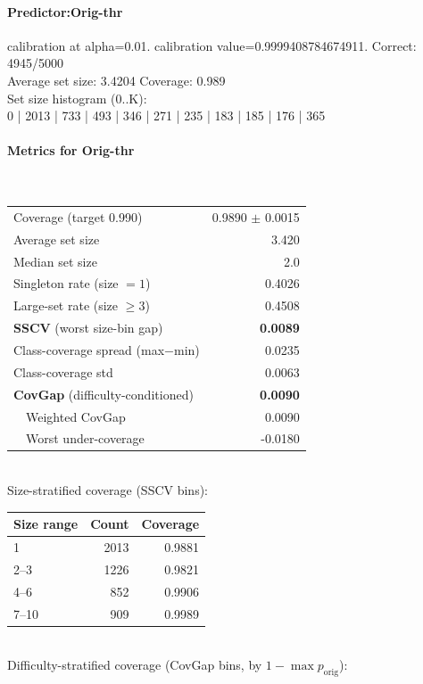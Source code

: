 \documentclass[parskip=half]{scrartcl}
\begin{document}
\paragraph{Predictor:Orig-thr} calibration at alpha=0.01. calibration value=0.9999408784674911. Correct: 4945/5000\\
Average set size: 3.4204   Coverage: 0.989\\
Set size histogram (0..K):\\
0 | 2013 | 733 | 493 | 346 | 271 | 235 | 183 | 185 | 176 | 365\\
\paragraph{Metrics for Orig-thr}~\\
\begin{tabular}{l r}
\hline
Coverage (target 0.990) & 0.9890 $\pm$ 0.0015 \\
Average set size & 3.420 \\
Median set size & 2.0 \\
Singleton rate (size $=1$) & 0.4026 \\
Large-set rate (size $\geq 3$) & 0.4508 \\
\textbf{SSCV} (worst size-bin gap) & \textbf{0.0089} \\
Class-coverage spread (max$-$min) & 0.0235 \\
Class-coverage std & 0.0063 \\
\textbf{CovGap} (difficulty-conditioned) & \textbf{0.0090} \\
~~Weighted CovGap & 0.0090 \\
~~Worst under-coverage & -0.0180 \\
\hline
\end{tabular}\\[0.5em]
\textsf{\scriptsize Size-stratified coverage (SSCV bins):}\\
\begin{tabular}{l r r}
\hline
Size range & Count & Coverage \\
\hline
1 & 2013 & 0.9881 \\
2--3 & 1226 & 0.9821 \\
4--6 & 852 & 0.9906 \\
7--10 & 909 & 0.9989 \\
\hline
\end{tabular}\\[0.5em]
\textsf{\scriptsize Difficulty-stratified coverage (CovGap bins, by $1-\max p_{\mathrm{orig}}$):}\\
\end{document}

